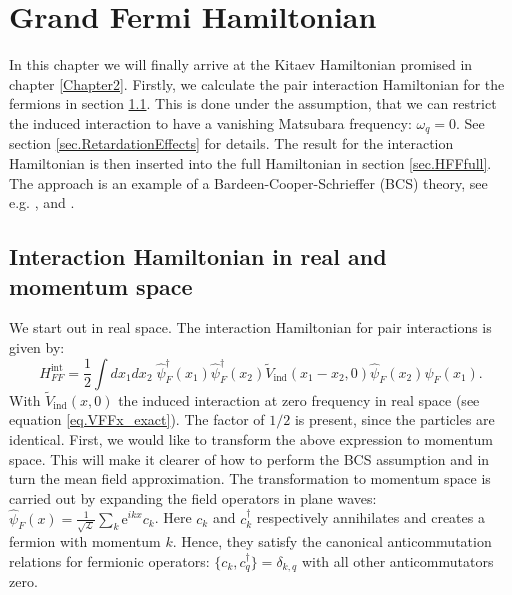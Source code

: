 
\chapter{Grand Fermi Hamiltonian} %

\label{Chapter4} %


In this chapter we will finally arrive at the Kitaev Hamiltonian promised in chapter \ref{Chapter2}. Firstly, we calculate the pair interaction Hamiltonian for the fermions in section \ref{sec.HFFint}. This is done under the assumption, that we can restrict the induced interaction to have a vanishing Matsubara frequency: $\omega_q = 0$. See section \ref{sec.RetardationEffects} for details. The result for the interaction Hamiltonian is then inserted into the full Hamiltonian in section \ref{sec.HFFfull}. The approach is an example of a Bardeen-Cooper-Schrieffer (BCS) theory, see e.g. \cite[chapter 3]{Tinkham}, \cite[pp. 153-163]{LandauStatPhys2} and \cite[pp. 359-369]{PlischkeStatPhys}. 

\section{Interaction Hamiltonian in real and momentum space} \label{sec.HFFint}

We start out in real space. The interaction Hamiltonian for pair interactions is given by:
\begin{equation}
H^\text{int}_{FF} = \frac{1}{2}\int dx_1dx_2\; \hat{\psi}^\dagger_F(x_1)\hat{\psi}^\dagger_F(x_2)\tilde{V}_{\text{ind}}(x_1-x_2,0) \hat{\psi}_F(x_2) \hat{\psi}_F(x_1).
\label{eq.HFFintdef}
\end{equation}
With $\tilde{V}_\text{ind}(x,0)$ the induced interaction at zero frequency in real space (see equation \eqref{eq.VFFx_exact}). The factor of $1/2$ is present, since the particles are identical. First, we would like to transform the above expression to momentum space. This will make it clearer of how to perform the BCS assumption and in turn the mean field approximation. The transformation to momentum space is carried out by expanding the field operators in plane waves: $\hat{\psi}_F(x) = \frac{1}{\sqrt{\mathcal{L}}}\sum_k \text{e}^{ikx} c_k$. Here $c_k$ and $c^\dagger_k$ respectively annihilates and creates a fermion with momentum $k$. Hence, they satisfy the canonical anticommutation relations for fermionic operators: $\{c_k, c^\dagger_q\} = \delta_{k,q}$ with all other anticommutators zero.  

